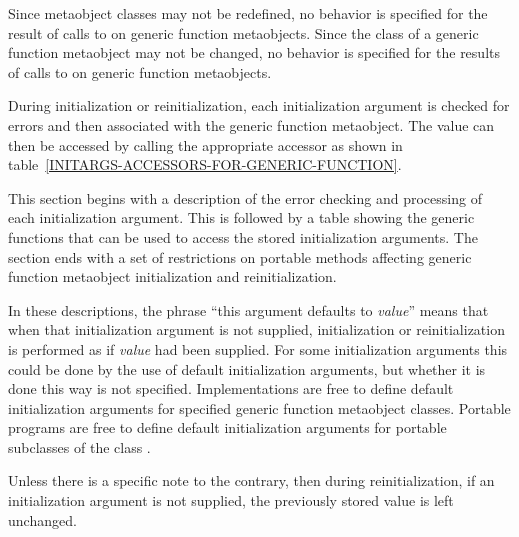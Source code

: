 Since metaobject classes may not be redefined, no behavior is specified for the
result of calls to  on generic function
metaobjects. Since the class of a generic function metaobject may not be
changed, no behavior is specified for the results of calls to
 on generic function metaobjects.

During initialization or reinitialization, each initialization argument is
checked for errors and then associated with the generic function metaobject. The
value can then be accessed by calling the appropriate accessor as shown in
table~\ref{INITARGS-ACCESSORS-FOR-GENERIC-FUNCTION}.

This section begins with a description of the error checking and processing of
each initialization argument. This is followed by a table showing the generic
functions that can be used to access the stored initialization arguments. The
section ends with a set of restrictions on portable methods affecting generic
function metaobject initialization and reinitialization. 

In these descriptions, the phrase ``this argument defaults to \emph{value}''
means that when that initialization argument is not supplied, initialization or
reinitialization is performed as if \emph{value} had been supplied. For some
initialization arguments this could be done by the use of default initialization
arguments, but whether it is done this way is not specified. Implementations are
free to define default initialization arguments for specified generic function
metaobject classes. Portable programs are free to define default initialization
arguments for portable subclasses of the class .

Unless there is a specific note to the contrary, then during reinitialization,
if an initialization argument is not supplied, the previously stored value is
left unchanged. 

